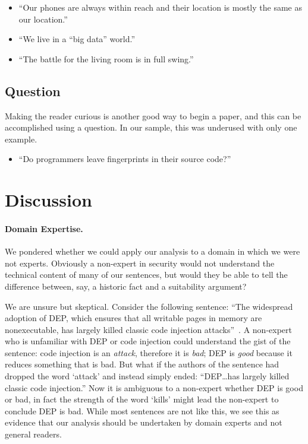 \documentclass[sigconf]{acmart}
\begin{document}
	\begin{itemize}

		\item 	``Our phones are always within reach and their location is mostly the same as our location.''~\cite{michalevsky2015powerspy}

		\item 	``We live in a “big data” world.''~\cite{lecuyer2014xray}

		\item 	``The battle for the living room is in full swing.''~\cite{oren2014aether}
	\end{itemize}


	\subsection{Question}

	Making the reader curious is another good way to begin a paper, and this can be accomplished using a question. In our sample, this was underused with only one example.
	\begin{itemize}
		\item ``Do programmers leave fingerprints in their source code?''~\cite{caliskan2015anonymizing}
	\end{itemize}


	\section{Discussion}
	\label{sec:disc}


	\paragraph{Domain Expertise.} We pondered whether we could apply our analysis to a domain in which we were not experts. Obviously a non-expert in security would not understand the technical content of many of our sentences, but would they be able to tell the difference between, say, a historic fact and a suitability argument?

	We are unsure but skeptical. Consider the following sentence: ``The widespread adoption of DEP, which ensures that all writable pages in memory are nonexecutable, has largely killed classic code injection attacks''~\cite{carlini2014rop}. A non-expert who is unfamiliar with DEP or code injection could understand the gist of the sentence: code injection is an \textit{attack}, therefore it is \textit{bad}; DEP is \textit{good} because it reduces something that is bad. But what if the authors of the sentence had dropped the word `attack' and instead simply ended: ``DEP\ldots has largely killed classic code injection.'' Now it is ambiguous to a non-expert whether DEP is good or bad, in fact the strength of the word `kills' might lead the non-expert to conclude DEP is bad. While most sentences are not like this, we see this as evidence that our analysis should be undertaken by domain experts and not general readers.
\end{document}
